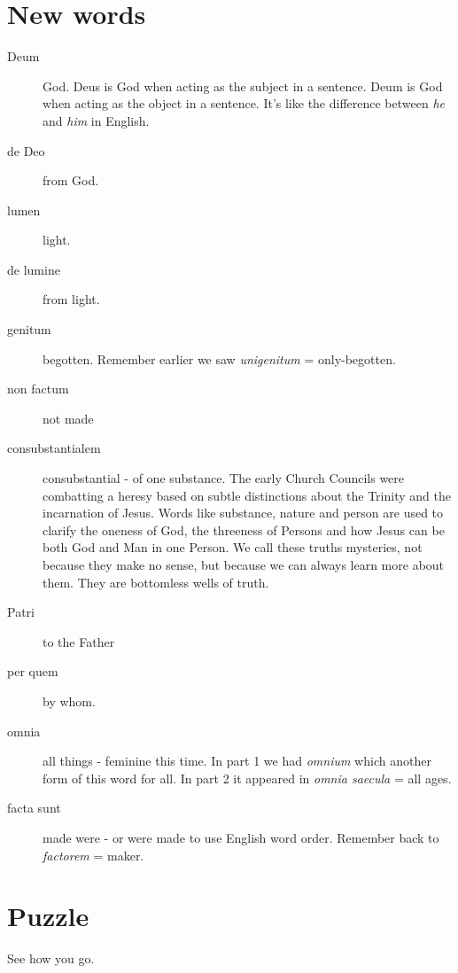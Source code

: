 \documentclass{article}
\begin{document}
\section{New words}

\begin{description}
\item[Deum] God.  Deus is God when acting as the subject in a sentence.  Deum is God when acting as the object in a sentence.  It's like the difference between \emph{he} and \emph{him} in English.
\item[de Deo] from God.
\item[lumen] light.
\item[de lumine] from light.
\item[genitum] begotten.  Remember earlier we saw \emph{unigenitum} = only-begotten.
\item[non factum] not made
\item[consubstantialem] consubstantial - of one substance.  The early Church Councils were combatting a heresy based on subtle distinctions about the Trinity and the incarnation of Jesus.  Words like substance, nature and person are used to clarify the oneness of God, the threeness of Persons and how Jesus can be both God and Man in one Person.  We call these truths mysteries, not because they make no sense, but because we can always learn more about them.  They are bottomless wells of truth.
\item[Patri] to the Father
\item[per quem] by whom.
\item[omnia] all things - feminine this time.  In part 1 we had \emph{omnium} which another form of this word for all.  In part 2 it appeared in \emph{omnia saecula} = all ages.
\item[facta sunt] made were - or were made to use English word order.  Remember back to \emph{factorem} = maker.
\end{description}

\newpage

\section{Puzzle}

See how you go.
\end{document}
